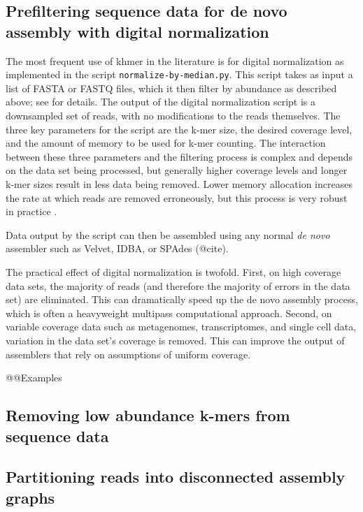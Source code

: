 \documentclass[10pt,a4paper,twocolumn]{article}
\begin{document}
\subsection*{Prefiltering sequence data for de novo assembly with digital normalization}

The most frequent use of khmer in the literature is for digital normalization as implemented in
the script {\tt normalize-by-median.py}.   This script takes as input a list of FASTA or FASTQ
files, which it then filter by abundance as described above; see \cite{diginorm} for details.  The output of the digital normalization script is a downsampled set of reads, with no modifications to the reads themselves.  The three key parameters for the script are the k-mer size, the desired coverage level, and the amount of memory to be used for k-mer counting.  The interaction between these three parameters and the filtering process is complex and depends on the data set being processed, but generally higher coverage levels and longer k-mer sizes result in less data being removed.  Lower memory allocation increases the rate at which reads are removed erroneously, but this process is very robust in practice \cite{zhang2014}.   


Data output by the script can then be assembled using any normal {\em de novo} assembler such as Velvet, IDBA, or SPAdes (@cite).

The practical effect of digital normalization is twofold. First, on high coverage data sets, the majority of reads (and therefore the majority of errors in the data set) are eliminated.  This can
dramatically speed up the de novo assembly process, which is often a heavyweight multipass
computational approach.  Second, on variable coverage data such as metagenomes, transcriptomes, and single cell data, variation in the data set's coverage is removed.  This can improve the output of assemblers that rely on assumptions of uniform coverage.

@@Examples

\subsection*{Removing low abundance k-mers from sequence data}

\subsection*{Partitioning reads into disconnected assembly graphs}
\end{document}
